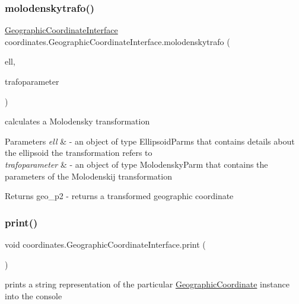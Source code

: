 \subsubsection{\texorpdfstring{molodenskytrafo()}{molodenskytrafo()}}
{\footnotesize\ttfamily \hyperlink{classcoordinates_1_1_geographic_coordinate_interface}{Geographic\+Coordinate\+Interface} coordinates.\+Geographic\+Coordinate\+Interface.\+molodenskytrafo (\begin{DoxyParamCaption}\item[{\hyperlink{classparams_1_1_ellipsoid_parms}{Ellipsoid\+Parms}}]{ell,  }\item[{\hyperlink{classparams_1_1_molodensky_parm}{Molodensky\+Parm}}]{trafoparameter }\end{DoxyParamCaption})}



calculates a Molodensky transformation 


\begin{DoxyParams}{Parameters}
{\em ell} & -\/ an object of type Ellipsoid\+Parms that contains details about the ellipsoid the transformation refers to \\
\hline
{\em trafoparameter} & -\/ an object of type Molodensky\+Parm that contains the parameters of the Molodenskij transformation \\
\hline
\end{DoxyParams}
\begin{DoxyReturn}{Returns}
geo\+\_\+p2 -\/ returns a transformed geographic coordinate 
\end{DoxyReturn}
\mbox{\label{classcoordinates_1_1_geographic_coordinate_interface_a8d32481c2a4f1134d73cd05e2837e8d1}} 
\subsubsection{\texorpdfstring{print()}{print()}}
{\footnotesize\ttfamily void coordinates.\+Geographic\+Coordinate\+Interface.\+print (\begin{DoxyParamCaption}{ }\end{DoxyParamCaption})}



prints a string representation of the particular \hyperlink{classcoordinates_1_1_geographic_coordinate}{Geographic\+Coordinate} instance into the console 

